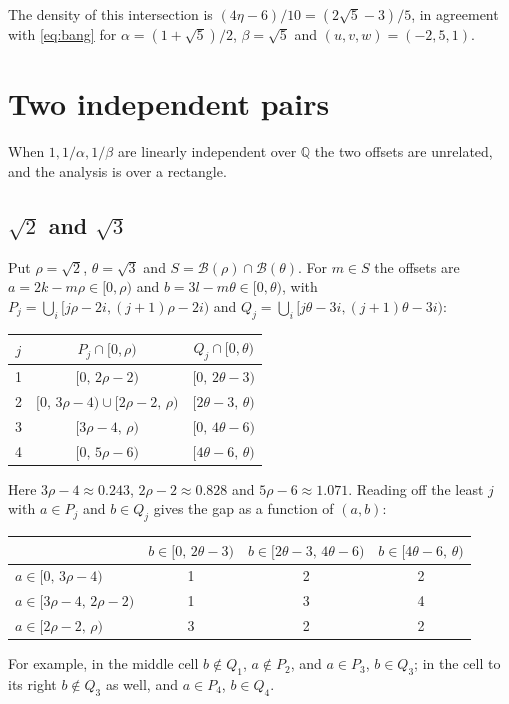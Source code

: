 \documentclass[12pt]{article}
\newcommand{\B}{\mathcal{B}}
\newcommand{\Q}{\mathbb{Q}}
\theoremstyle{plain}
\theoremstyle{remark}
\begin{document}
The density of this intersection is $(4\eta-6)/10=(2\sqrt5-3)/5$, in agreement with
\eqref{eq:bang} for $\alpha=(1+\sqrt5)/2$, $\beta=\sqrt5$ and $(u,v,w)=(-2,5,1)$.

\section{Two independent pairs}\label{sec:indep}

When $1,1/\alpha,1/\beta$ are linearly independent over $\Q$ the two offsets are unrelated, and
the analysis is over a rectangle.

\subsection{\texorpdfstring{$\sqrt2$}{sqrt 2} and \texorpdfstring{$\sqrt3$}{sqrt 3}}

Put $\rho=\sqrt2$, $\theta=\sqrt3$ and $S=\B(\rho)\cap\B(\theta)$. For $m\in S$ the offsets are
$a=2k-m\rho\in[0,\rho)$ and $b=3l-m\theta\in[0,\theta)$, with
$P_j=\bigcup_i[j\rho-2i,(j+1)\rho-2i)$ and $Q_j=\bigcup_i[j\theta-3i,(j+1)\theta-3i)$:
\begin{center}
\begin{tabular}{ccc}
\toprule
$j$ & $P_j\cap[0,\rho)$ & $Q_j\cap[0,\theta)$\\
\midrule
1 & $[0,\,2\rho-2)$ & $[0,\,2\theta-3)$\\
2 & $[0,\,3\rho-4)\cup[2\rho-2,\,\rho)$ & $[2\theta-3,\,\theta)$\\
3 & $[3\rho-4,\,\rho)$ & $[0,\,4\theta-6)$\\
4 & $[0,\,5\rho-6)$ & $[4\theta-6,\,\theta)$\\
\bottomrule
\end{tabular}
\end{center}
Here $3\rho-4\approx0.243$, $2\rho-2\approx0.828$ and $5\rho-6\approx1.071$. Reading off the
least $j$ with $a\in P_j$ and $b\in Q_j$ gives the gap as a function of $(a,b)$:
\begin{center}
\begin{tabular}{lccc}
\toprule
 & $b\in[0,\,2\theta-3)$ & $b\in[2\theta-3,\,4\theta-6)$ & $b\in[4\theta-6,\,\theta)$\\
\midrule
$a\in[0,\,3\rho-4)$ & 1 & 2 & 2\\
$a\in[3\rho-4,\,2\rho-2)$ & 1 & 3 & 4\\
$a\in[2\rho-2,\,\rho)$ & 3 & 2 & 2\\
\bottomrule
\end{tabular}
\end{center}
For example, in the middle cell $b\notin Q_1$, $a\notin P_2$, and $a\in P_3$, $b\in Q_3$; in
the cell to its right $b\notin Q_3$ as well, and $a\in P_4$, $b\in Q_4$.
\end{document}
